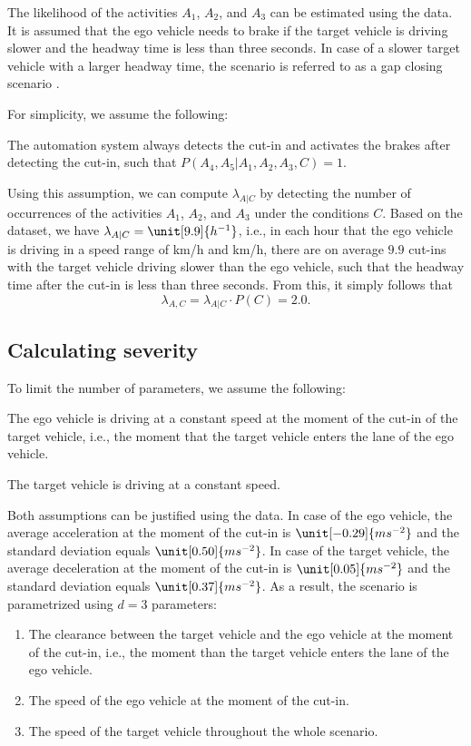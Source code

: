The likelihood of the activities $A_1$, $A_2$, and $A_3$ can be estimated using the data. It is assumed that the ego vehicle needs to brake if the target vehicle is driving slower and the headway time is less than three seconds. In case of a slower target vehicle with a larger headway time, the scenario is referred to as a gap closing scenario \cite{semsarkazerooni2016cacc, gelder2016pacc}.

For simplicity, we assume the following:
\begin{assumption}
	The automation system always detects the cut-in and activates the brakes after detecting the cut-in, such that $P(A_4,A_5|A_1,A_2,A_3,C) = 1$.
\end{assumption}

Using this assumption, we can compute $\lambda_{A|C}$ by detecting the number of occurrences of the activities $A_1$, $A_2$, and $A_3$ under the conditions $C$. Based on the dataset, we have $\lambda_{A|C}=\unit[9.9]{h^{-1}}$, i.e., in each hour that the ego vehicle is driving in a speed range of \unit[60]{km/h} and \unit[130]{km/h}, there are on average $9.9$ cut-ins with the target vehicle driving slower than the ego vehicle, such that the headway time after the cut-in is less than three seconds. From this, it simply follows that
\begin{equation}
	\lambda_{A,C} = \lambda_{A|C} \cdot P(C) = 2.0.
\end{equation}



\subsection{Calculating severity}

To limit the number of parameters, we assume the following:
\begin{assumption}
	The ego vehicle is driving at a constant speed at the moment of the cut-in of the target vehicle, i.e., the moment that the target vehicle enters the lane of the ego vehicle.
\end{assumption}
\begin{assumption}
	The target vehicle is driving at a constant speed.
\end{assumption}
Both assumptions can be justified using the data. In case of the ego vehicle, the average acceleration at the moment of the cut-in is $\unit[-0.29]{ms^{-2}}$ and the standard deviation equals $\unit[0.50]{ms^{-2}}$. In case of the target vehicle, the average deceleration at the moment of the cut-in is $\unit[0.05]{ms^{-2}}$ and the standard deviation equals $\unit[0.37]{ms^{-2}}$. As a result, the scenario is parametrized using $d=3$ parameters:
\begin{enumerate}
	\item The clearance between the target vehicle and the ego vehicle at the moment of the cut-in, i.e., the moment than the target vehicle enters the lane of the ego vehicle.
	\item The speed of the ego vehicle at the moment of the cut-in.
	\item The speed of the target vehicle throughout the whole scenario.
\end{enumerate}


